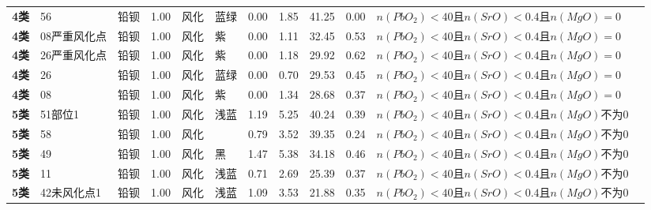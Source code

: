 \documentclass[withoutpreface,bwprint]{cumcmthesis} %
\begin{document}
\begin{appendices}
\begin{table}[!h]
\begin{tabular}{@{}llllllllllll@{}}
			\textbf{4类} & 56             & 铅钡          & 1.00      & 风化            & 蓝绿          & 0.00              & 1.85                & 41.25             & 0.00              & $n(PbO_2)<40$且$n(SrO)<0.4$且$n(MgO)=0$  &           \\
			\textbf{4类} & 08严重风化点        & 铅钡          & 1.00      & 风化            & 紫           & 0.00              & 1.11                & 32.45             & 0.53              & $n(PbO_2)<40$且$n(SrO)<0.4$且$n(MgO)=0$  &           \\
			\textbf{4类} & 26严重风化点        & 铅钡          & 1.00      & 风化            & 紫           & 0.00              & 1.18                & 29.92             & 0.62              & $n(PbO_2)<40$且$n(SrO)<0.4$且$n(MgO)=0$  &           \\
			\textbf{4类} & 26             & 铅钡          & 1.00      & 风化            & 蓝绿          & 0.00              & 0.70                & 29.53             & 0.45              & $n(PbO_2)<40$且$n(SrO)<0.4$且$n(MgO)=0$  &           \\
			\textbf{4类} & 08             & 铅钡          & 1.00      & 风化            & 紫           & 0.00              & 1.34                & 28.68             & 0.37              & $n(PbO_2)<40$且$n(SrO)<0.4$且$n(MgO)=0$  &           \\
			\textbf{5类} & 51部位1          & 铅钡          & 1.00      & 风化            & 浅蓝          & 1.19              & 5.25                & 40.24             & 0.39              & $n(PbO_2)<40$且$n(SrO)<0.4$且$n(MgO)不为0$ &           \\
			\textbf{5类} & 58             & 铅钡          & 1.00      & 风化            &             & 0.79              & 3.52                & 39.35             & 0.24              & $n(PbO_2)<40$且$n(SrO)<0.4$且$n(MgO)不为0$ &           \\
			\textbf{5类} & 49             & 铅钡          & 1.00      & 风化            & 黑           & 1.47              & 5.38                & 34.18             & 0.46              & $n(PbO_2)<40$且$n(SrO)<0.4$且$n(MgO)不为0$ &           \\
			\textbf{5类} & 11             & 铅钡          & 1.00      & 风化            & 浅蓝          & 0.71              & 2.69                & 25.39             & 0.37              & $n(PbO_2)<40$且$n(SrO)<0.4$且$n(MgO)不为0$ &           \\
			\textbf{5类} & 42未风化点1        & 铅钡          & 1.00      & 风化            & 浅蓝          & 1.09              & 3.53                & 21.88             & 0.35              & $n(PbO_2)<40$且$n(SrO)<0.4$且$n(MgO)不为0$ &           \\

\end{tabular}
\end{table}
\end{appendices}
\end{document}
